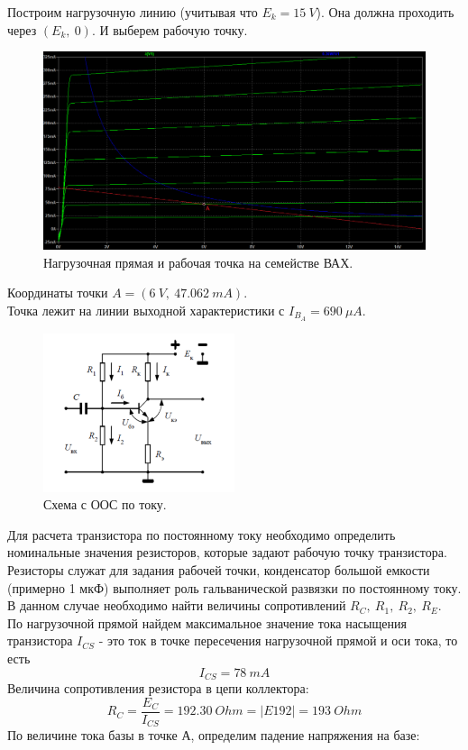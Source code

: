 \documentclass[12pt]{article}
\begin{document}
Построим нагрузочную линию (учитывая что $E_k = 15 \ V$). Она должна проходить через $(E_k, \ 0).$ И выберем рабочую точку.
\begin{figure}[H]
    \centering
    \includegraphics[width=\textwidth]{3_small_output_char_w_max_p_load_lines_and_A.png}
    \caption{Нагрузочная прямая и рабочая точка на семействе ВАХ.}
    \label{fig:3_small_output_char_w_max_p_load_lines_and_A.png}
\end{figure}

Координаты точки $A = (6 \ V, \ 47.062 \ mA)$.\\
Точка лежит на линии выходной характеристики с $I_{B_A} = 690 \ \mu A$.

\begin{figure}[H]
    \centering
    \includegraphics[width=0.5\textwidth]{3_scheme_book.png}
    \caption{Схема с ООС по току.}
    \label{fig:3_scheme_book.png}
\end{figure}

Для расчета транзистора по постоянному току необходимо определить номинальные значения резисторов, которые задают рабочую точку транзистора. \\
Резисторы служат для задания рабочей точки, конденсатор большой емкости (примерно 1 мкФ) выполняет роль гальванической развязки по постоянному току. В данном случае необходимо найти величины  сопротивлений $R_C, \ R_1, \ R_2, \ R_E.$ \\
По нагрузочной прямой найдем максимальное значение тока насыщения транзистора $I_{CS}$ - это ток в точке пересечения нагрузочной прямой и оси тока, то есть 
\[
I_{CS} = 78 \ mA
\]
Величина сопротивления резистора в цепи коллектора:
\[
R_C = \frac{E_C}{I_{CS}} = 192.30 \ Ohm = |E192| = 193 \ Ohm
\]
По величине тока базы в точке А, определим падение напряжения на базе:
\end{document}
